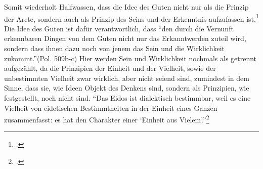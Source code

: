 Somit wiederholt Halfwassen, dass die Idee des Guten nicht nur als die Prinzip der Arete, sondern auch als Prinzip des Seins und der Erkenntnis aufzufassen ist.\footcite[vgl.][S. 238]{halfwassenaufstieg2006}
Die Idee des Guten ist dafür verantwortlich, dass \enquote{den durch die Vernunft erkennbaren Dingen von dem Guten nicht nur das Erkanntwerden zuteil wird, sondern dass ihnen dazu noch von jenem das Sein und die Wirklichkeit zukommt.}(Pol. 509b-c) 
Hier werden Sein und Wirklichkeit nochmals als getrennt aufgezählt, da die Prinzipien der Einheit und der Vielheit, sowie der unbestimmten Vielheit zwar wirklich, aber nicht seiend sind, zumindest in dem Sinne, dass sie, wie Ideen Objekt des Denkens sind, sondern als Prinzipien, wie festgestellt, noch nicht sind.
\enquote{Das Eidos ist dialektisch bestimmbar, weil es eine Vielheit von eidetischen Bestimmtheiten in der Einheit eines Ganzen zusammenfasst: es hat den Charakter einer \enquote{Einheit aus Vielem}.}\footcite[][S. 240]{halfwassenaufstieg2006}
